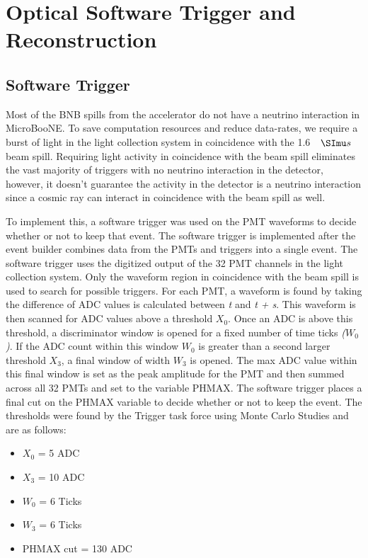 \section{Optical Software Trigger and Reconstruction}
\subsection{Software Trigger}
Most of the BNB spills from the accelerator do not have a neutrino interaction in MicroBooNE. To save computation resources and reduce data-rates, we require a burst of light in the light collection system in coincidence with the 1.6 $\micro s $ beam spill. Requiring light activity in coincidence with the beam spill eliminates the vast majority of triggers with no neutrino interaction in the detector, however, it doesn't guarantee the activity in the detector is a neutrino interaction since a cosmic ray can interact in coincidence with the beam spill as well.

To implement this, a software trigger was used on the PMT waveforms to decide whether or not to keep that event. The software trigger is implemented after the event builder combines data from the PMTs and triggers into a single event. The software trigger uses the digitized output of the 32 PMT channels in the light collection system. Only the waveform region in coincidence with the beam spill is used to search for possible triggers. For each PMT, a waveform is found by taking the difference of ADC values is calculated between \textit{t} and \textit{t + s}. This waveform is then scanned for ADC values above a threshold \textit{$X_0$}. Once an ADC is above this threshold, a discriminator window is opened for a fixed number of time ticks \textit{($W_0$)}. If the ADC count within this window \textit{$W_0$} is greater than a second larger threshold \textit{$X_3$}, a final window of width \textit{$W_3$} is opened. The max ADC value within this final window is set as the peak amplitude for the PMT and then summed across all 32 PMTs and set to the variable PHMAX. The software trigger places a final cut on the PHMAX variable to decide whether or not to keep the event. The thresholds were found by the Trigger task force using Monte Carlo Studies 
and are as follows: 
\begin{itemize}
\item{$X_0$ = 5 ADC} 
\item{$X_3$ = 10 ADC} 
\item{$W_0$ = 6 Ticks} 
\item{$W_3$ = 6 Ticks} 
\item{PHMAX cut = 130 ADC}
\end{itemize}

